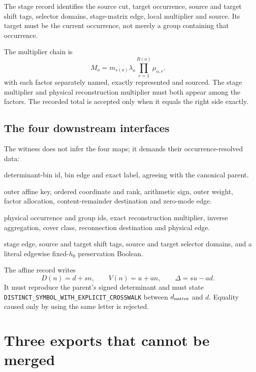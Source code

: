 \documentclass[11pt]{article}
\numberwithin{equation}{section}
\theoremstyle{definition}
\theoremstyle{remark}
\begin{document}
The stage record identifies the source cut, target occurrence,
source and target shift tags, selector domains, stage-matrix edge,
local multiplier and source.  Its target must be the current
occurrence, not merely a group containing that occurrence.

The multiplier chain is
\begin{equation}
 M_o=m_{s(o)}\lambda_o\prod_{r=1}^{R(o)}\mu_{o,r}.
\end{equation}
with each factor separately named, exactly represented and sourced.
The stage multiplier and physical reconstruction multiplier must both
appear among the factors.  The recorded total is accepted only when
it equals the right side exactly.

\subsection{The four downstream interfaces}

The witness does not infer the four maps; it demands their
occurrence-resolved data:

\begin{description}[leftmargin=3.2em,style=nextline]
\item[\(Q_D\), determinant quotient]
determinant-bin id, bin edge and exact label, agreeing with the
canonical parent.
\item[\(Q_Z\), outer zero-mode quotient]
outer affine key, ordered coordinate and rank, arithmetic sign, outer
weight, factor allocation, content-remainder destination and
zero-mode edge.
\item[\(G\), physical grouping]
physical occurrence and group ids, exact reconstruction multiplier,
inverse aggregation, cover class, reconnection destination and
physical edge.
\item[\(P_{h_0}\), downstream selector]
stage edge, source and target shift tags, source and target selector
domains, and a literal edgewise fixed-\(h_0\) preservation Boolean.
\end{description}

The affine record writes
\[
 D(n)=d+sn,\qquad V(n)=u+an,\qquad \Delta=su-ad.
\]
It must reproduce the parent's signed determinant and must state
\nolinkurl{DISTINCT_SYMBOL_WITH_EXPLICIT_CROSSWALK} between
\(d_{\rm native}\) and \(d\).  Equality caused only by using the same
letter is rejected.

\section{Three exports that cannot be merged}
\end{document}
